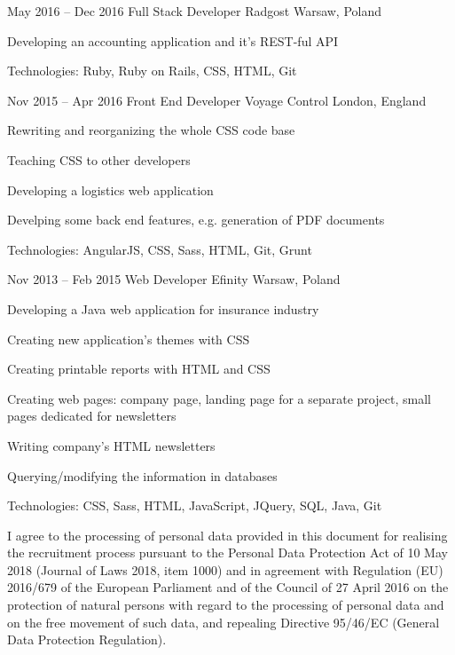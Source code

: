 \begin{sectionlist}
    \sectionlistitemjob
        {May 2016 -- Dec 2016}
        {Full Stack Developer}
        {Radgost}
        {Warsaw, Poland}
        {
            \begin{joblisting}
                \item Developing an accounting application and it's REST-ful
                    API
                \item Technologies: Ruby, Ruby on Rails, CSS, HTML, Git
            \end{joblisting}
        }

    \sectionlistitemjob
        {Nov 2015 -- Apr 2016}
        {Front End Developer}
        {Voyage Control}
        {London, England}
        {
            \begin{joblisting}
                \item Rewriting and reorganizing the whole CSS code base
                \item Teaching CSS to other developers
                \item Developing a logistics web application
                \item Develping some back end features, e.g. generation of PDF
                    documents
                \item Technologies: AngularJS, CSS, Sass, HTML, Git, Grunt
            \end{joblisting}
        }

    \sectionlistitemjob
        {Nov 2013 -- Feb 2015}
        {Web Developer}
        {Efinity}
        {Warsaw, Poland}
        {
            \begin{joblisting}
                \item Developing a Java web application for insurance industry
                \item Creating new application's themes with CSS
                \item Creating printable reports with HTML and CSS
                \item Creating web pages: company page, landing page for a separate project, small pages dedicated for newsletters
                \item Writing company's HTML newsletters
                \item Querying/modifying the information in databases
                \item Technologies: CSS, Sass, HTML, JavaScript, JQuery,
                    SQL, Java, Git
            \end{joblisting}
        }

\end{sectionlist}

\vspace*{\fill}
\small
I agree to the processing of personal data provided in this document for
realising the recruitment process pursuant to the Personal Data Protection
Act of 10 May 2018 (Journal of Laws 2018, item 1000) and in agreement with
Regulation (EU) 2016/679 of the European Parliament and of the Council of 27
April 2016 on the protection of natural persons with regard to the
processing of personal data and on the free movement of such data, and
repealing Directive 95/46/EC (General Data Protection Regulation).
